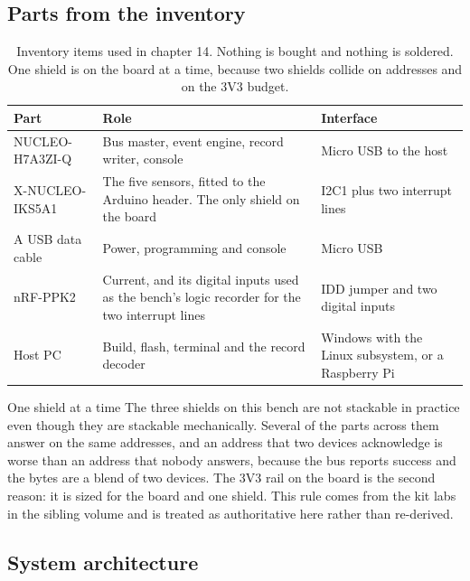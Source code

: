 \subsection*{Parts from the inventory}

\begin{table}[H]\centering\small
\begin{tabular}{p{40mm}p{66mm}p{40mm}}
\toprule
Part & Role & Interface \\
\midrule
NUCLEO-H7A3ZI-Q & Bus master, event engine, record writer, console & Micro USB to the host \\
X-NUCLEO-IKS5A1 & The five sensors, fitted to the Arduino header. The only shield on the board & I2C1 plus two interrupt lines \\
A USB data cable & Power, programming and console & Micro USB \\
nRF-PPK2 & Current, and its digital inputs used as the bench's logic recorder for the two interrupt lines & IDD jumper and two digital inputs \\
Host PC & Build, flash, terminal and the record decoder & Windows with the Linux subsystem, or a Raspberry Pi \\
\bottomrule
\end{tabular}
\caption{Inventory items used in chapter 14. Nothing is bought and nothing is soldered. One shield is on the board at a time, because two shields collide on addresses and on the 3V3 budget.}
\end{table}

\begin{note}{One shield at a time}
The three shields on this bench are not stackable in practice even though they
are stackable mechanically. Several of the parts across them answer on the same
addresses, and an address that two devices acknowledge is worse than an address
that nobody answers, because the bus reports success and the bytes are a
blend of two devices. The 3V3 rail on the board is the second reason: it is
sized for the board and one shield. This rule comes from the kit labs in the
sibling volume and is treated as authoritative here rather than re-derived.
\end{note}

\subsection*{System architecture}


